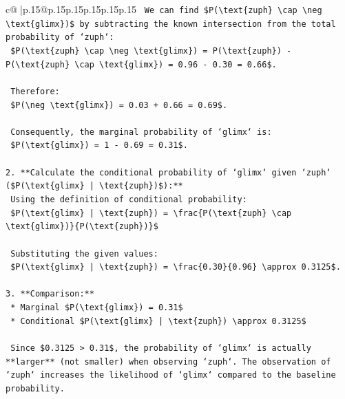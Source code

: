 \documentclass{article}
\begin{document}
{\begin{supertabular}{c@{$\;$}|p{.15\linewidth}@{}p{.15\linewidth}p{.15\linewidth}p{.15\linewidth}p{.15\linewidth}p{.15\linewidth}}
{{{\texttt{    We can find \$P(\textbackslash{}text\{zuph\} \textbackslash{}cap \textbackslash{}neg \textbackslash{}text\{glimx\})\$ by subtracting the known intersection from the total probability of `zuph`:} \\
\texttt{    \$P(\textbackslash{}text\{zuph\} \textbackslash{}cap \textbackslash{}neg \textbackslash{}text\{glimx\}) = P(\textbackslash{}text\{zuph\}) {-} P(\textbackslash{}text\{zuph\} \textbackslash{}cap \textbackslash{}text\{glimx\}) = 0.96 {-} 0.30 = 0.66\$.} \\
\\ 
\texttt{    Therefore:} \\
\texttt{    \$P(\textbackslash{}neg \textbackslash{}text\{glimx\}) = 0.03 + 0.66 = 0.69\$.} \\
\\ 
\texttt{    Consequently, the marginal probability of `glimx` is:} \\
\texttt{    \$P(\textbackslash{}text\{glimx\}) = 1 {-} 0.69 = 0.31\$.} \\
\\ 
\texttt{2.  **Calculate the conditional probability of `glimx` given `zuph` (\$P(\textbackslash{}text\{glimx\} | \textbackslash{}text\{zuph\})\$):**} \\
\texttt{    Using the definition of conditional probability:} \\
\texttt{    \$P(\textbackslash{}text\{glimx\} | \textbackslash{}text\{zuph\}) = \textbackslash{}frac\{P(\textbackslash{}text\{zuph\} \textbackslash{}cap \textbackslash{}text\{glimx\})\}\{P(\textbackslash{}text\{zuph\})\}\$} \\
\\ 
\texttt{    Substituting the given values:} \\
\texttt{    \$P(\textbackslash{}text\{glimx\} | \textbackslash{}text\{zuph\}) = \textbackslash{}frac\{0.30\}\{0.96\} \textbackslash{}approx 0.3125\$.} \\
\\ 
\texttt{3.  **Comparison:**} \\
\texttt{    *   Marginal \$P(\textbackslash{}text\{glimx\}) = 0.31\$} \\
\texttt{    *   Conditional \$P(\textbackslash{}text\{glimx\} | \textbackslash{}text\{zuph\}) \textbackslash{}approx 0.3125\$} \\
\\ 
\texttt{    Since \$0.3125 > 0.31\$, the probability of `glimx` is actually **larger** (not smaller) when observing `zuph`. The observation of `zuph` increases the likelihood of `glimx` compared to the baseline probability.} \\
}}}
\end{supertabular}}
\end{document}
